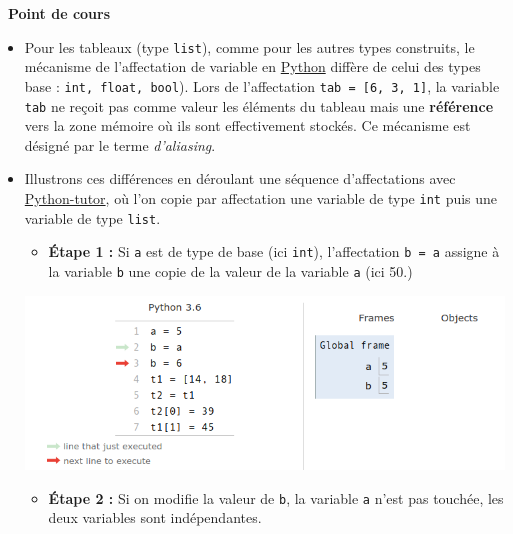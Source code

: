 \documentclass[
  11pt,
]{article}
\newcommand{\passthrough}[1]{#1}
\providecommand{\tightlist}{%
  \setlength{\itemsep}{0pt}\setlength{\parskip}{0pt}}
\newcounter{cours}
\newenvironment{cours}[1]
{\par \medskip   \addtocounter{cours}{1} \noindent  
\begin{bclogo}[arrondi =0.1,  ombre = true, barre=none, logo=\bcbook, marge=4]{~\textbf{Point de cours} \textbf{\thecours} {\itshape #1} }  \par}
{
\end{bclogo}
 \par \bigskip }
\begin{document}
\begin{cours}{}

\begin{itemize}
\item
  Pour les tableaux (type \passthrough{\lstinline!list!}), comme pour
  les autres types construits, le mécanisme de l'affectation de variable
  en
  \href{https://docs.python.org/3/tutorial/datastructures.html}{Python}
  diffère de celui des types base :
  \passthrough{\lstinline!int, float, bool!}). Lors de l'affectation
  \passthrough{\lstinline!tab = [6, 3, 1]!}, la variable
  \passthrough{\lstinline!tab!} ne reçoit pas comme valeur les éléments
  du tableau mais une \textbf{référence} vers la zone mémoire où ils
  sont effectivement stockés. Ce mécanisme est désigné par le terme
  \emph{d'aliasing}.
\item
  Illustrons ces différences en déroulant une séquence d'affectations
  avec
  \href{http://pythontutor.com/visualize.html\#mode=edit}{Python-tutor},
  où l'on copie par affectation une variable de type
  \passthrough{\lstinline!int!} puis une variable de type
  \passthrough{\lstinline!list!}.

  \begin{itemize}
  \tightlist
  \item
    \textbf{Étape 1 :} Si \passthrough{\lstinline!a!} est de type de
    base (ici \passthrough{\lstinline!int!}), l'affectation
    \passthrough{\lstinline!b = a!} assigne à la variable
    \passthrough{\lstinline!b!} une copie de la valeur de la variable
    \passthrough{\lstinline!a!} (ici 50.)
  \end{itemize}

  \includegraphics{images/aliasing1.png}\\

  \begin{itemize}
  \tightlist
  \item
    \textbf{Étape 2 :} Si on modifie la valeur de
    \passthrough{\lstinline!b!}, la variable \passthrough{\lstinline!a!}
    n'est pas touchée, les deux variables sont indépendantes.
  \end{itemize}


\end{itemize}
\end{cours}
\end{document}
